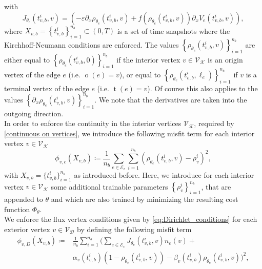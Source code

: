 with 
\begin{equation} 
    \label{misfit flux}
    J_{\theta_e}\left( t_{v,b}^i, v \right) = \left( - \varepsilon \partial_x \rho_{\theta_e}  \left( t_{v,b}^i, v \right) + f \left( \rho_{\theta_e}  \left( t_{v,b}^i, v \right) \right) \partial_x V_e \left( t_{v,b}^i, v \right) \right),
\end{equation}
where $X_{v,b} = \left\{ t_{v,b}^i \right\}_{i=1}^{n_b} \subset \left( 0,T \right)$ is a set of time snapshots where the Kirchhoff-Neumann conditions are enforced. The values $\left\{ \rho_{\theta_e}  \left( t_{v,b}^i, v \right) \right\}_{i=1}^{n_b}$ are either equal to $\left\{ \rho_{\theta_e}  \left( t_{v,b}^i, 0 \right) \right\}_{i=1}^{n_b}$ if the interior vertex $v \in \mathcal{V}_\mathcal{K}$ is an origin vertex of the edge $e$ (i.e. $\operatorname{o}(e) = v$), or equal to $\left\{ \rho_{\theta_e}  \left( t_{v,b}^i, \ell_e \right) \right\}_{i=1}^{n_b}$ if $v$ is a terminal vertex of the edge $e$ (i.e. $\operatorname{t}(e) = v$). Of course this also applies to the values $\left\{ \partial_x \rho_{\theta_e}  \left( t_{v,b}^i, v \right) \right\}_{i=1}^{n_b}$. We note that the derivatives are taken into the outgoing direction. \\
In order to enforce the continuity in the interior vertices $\mathcal{V}_\mathcal{K}$, required by \cref{continuous on vertices}, we introduce the following misfit term for each interior vertex $v \in \mathcal{V}_\mathcal{K}$ 
\begin{equation} 
    \label{misfit:continuity}
    \phi_{v,c}  \left( X_{v,b} \right) \coloneqq \frac{1}{n_b} \sum_{e \in \mathcal{E}_v} \sum_{i=1}^{n_b} \left(  \rho_{\theta_e}  \left( t_{v,b}^i, v \right) - \rho_{v}^i \right)^2,
\end{equation} 
with $X_{v,b} = \{t_{v,b}^i\}_{i=1}^{n_b}$ as introduced before. Here, we introduce for each interior vertex $v \in \mathcal{V}_\mathcal{K}$ some additional trainable parameters $\left\{ \rho_{v}^i \right\}_{i=1}^{n_b}$, that are appended to $\theta$ and which are also trained by minimizing the resulting cost function $\Phi_\theta$. \\
We enforce the flux vertex conditions given by \cref{eq:Dirichlet_conditions} for each exterior vertex $v \in \mathcal{V}_\mathcal{D}$ by defining the following misfit term  
\begin{equation}
    \label{misfit:Dirichlet}
    \begin{aligned} 
        \phi_{v,D}  \left( X_{v,b} \right) \coloneqq & \frac{1}{n_b} \sum_{i=1}^{n_b} \bigg( \sum_{e \in \mathcal{E}_v} J_{\theta_e}\left( t_{v,b}^i, v \right) n_e  \left( v \right) + \\
        & \alpha_v \left( t_{v,b}^i \right)  \left( 1- \rho_{\theta_e}  \left( t_{v,b}^i, v \right) \right) - \beta_v \left( t_{v,b}^i \right) \rho_{\theta_e}  \left( t_{v,b}^i, v \right) \bigg)^2,
    \end{aligned}
\end{equation}
